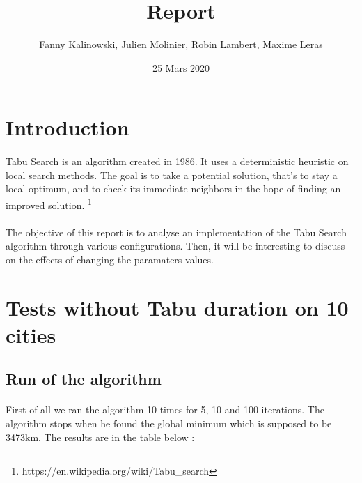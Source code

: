 \documentclass[12pt,oneside,a4paper]{article}
\begin{document}
\title{Report}
\author{Fanny Kalinowski, Julien Molinier, Robin Lambert, Maxime Leras}
\date{25 Mars 2020}
\maketitle\thispagestyle{empty}

\newpage    
\renewcommand*\contentsname{Sommaire}
\clearpage
\thispagestyle{empty}
\tableofcontents
\newpage

\pagestyle{fancy}
\cfoot{\thepage}
\fancyhead{}
\fancyhead[R]{\leftmark}

\section{Introduction}
\paragraph{}
    Tabu Search is an algorithm created in 1986. It uses a deterministic heuristic on
    local search methods. The goal is to take a potential solution, that's to stay a local optimum,  
    and to check its immediate neighbors in the hope of finding an improved solution.
    \footnote{https://en.wikipedia.org/wiki/Tabu\_search}
\paragraph{}
    The objective of this report is to analyse an implementation of the Tabu Search algorithm through various configurations.
    Then, it will be interesting to discuss on the effects of changing the paramaters values.

\section{Tests without Tabu duration on 10 cities}
\subsection{Run of the algorithm}
\paragraph{}
    First of all we ran the algorithm 10 times for 5, 10 and 100 iterations. The algorithm stops when he found
    the global minimum which is supposed to be 3473km. The results are in the table below :    
\end{document}
